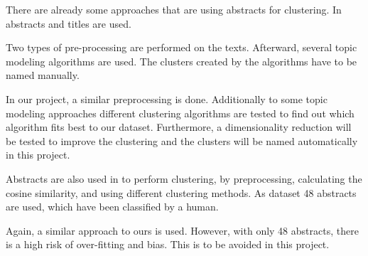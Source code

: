 There are already some approaches that are using abstracts for clustering.
In \cite{Clustering_scientific_documents_with_topic_modeling} abstracts and titles are used.

Two types of pre-processing are performed on the texts. 
Afterward, several topic modeling algorithms are used. 
The clusters created by the algorithms have to be named manually.

In our project, a similar preprocessing is done.
Additionally to some topic modeling approaches different clustering algorithms are tested to find out which algorithm fits best to our dataset. 
Furthermore, a dimensionality reduction will be tested to improve the clustering and the clusters will be named automatically in this project.

Abstracts are also used in \cite{An_Approach_to_Clustering_Abstracts} to perform clustering, by preprocessing, calculating the cosine similarity, and using different clustering methods.
As dataset 48 abstracts are used, which have been classified by a human.

Again, a similar approach to ours is used. However, with only 48 abstracts, there is a high risk of over-fitting and bias.
This is to be avoided in this project.
